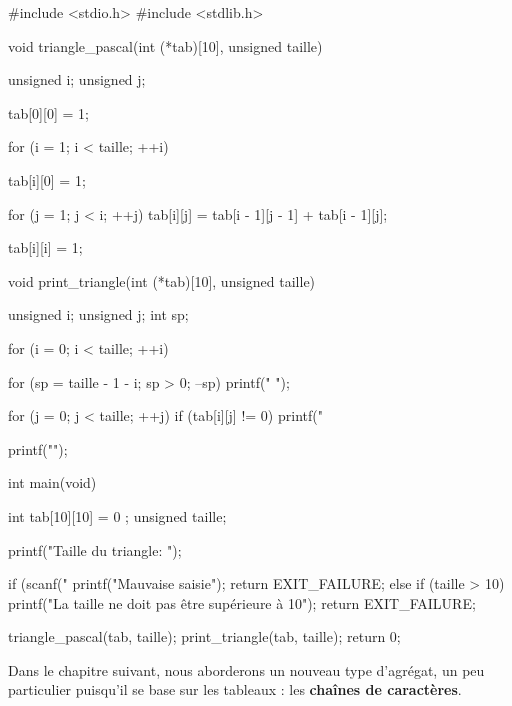 \begin{C}
 #include <stdio.h>
#include <stdlib.h>


void triangle_pascal(int (*tab)[10], unsigned taille)
{
    unsigned i;
    unsigned j;

    tab[0][0] = 1;

    for (i = 1; i < taille; ++i)
    {
        tab[i][0] = 1;

        for (j = 1; j < i; ++j)
            tab[i][j] = tab[i - 1][j - 1] + tab[i - 1][j];

        tab[i][i] = 1;
    }
}


void print_triangle(int (*tab)[10], unsigned taille)
{
    unsigned i;
    unsigned j;
    int sp;

    for (i = 0; i < taille; ++i)
    {
        for (sp = taille - 1 - i; sp > 0; --sp)
            printf(" ");

        for (j = 0; j < taille; ++j)
            if (tab[i][j] != 0)
                printf("%

        printf("\n");
    }
}


int main(void)
{
    int tab[10][10] = { { 0 } };
    unsigned taille;

    printf("Taille du triangle: ");

    if (scanf("%
    {
        printf("Mauvaise saisie\n");
        return EXIT_FAILURE;
    }
    else if (taille > 10)
    {
        printf("La taille ne doit pas être supérieure à 10\n");
        return EXIT_FAILURE;
    }

    triangle_pascal(tab, taille);
    print_triangle(tab, taille);  
    return 0;
}
\end{C}

\hrulefill

Dans le chapitre suivant, nous aborderons un nouveau type
d'agrégat, un peu particulier puisqu'il se base sur les tableaux : les
\textbf{chaînes de caractères}.